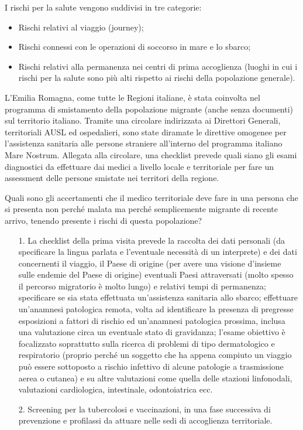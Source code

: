 I rischi per la salute vengono suddivisi in tre categorie:

\begin{itemize}
\item
  Rischi relativi al viaggio (journey);
\item
  Rischi connessi con le operazioni di soccorso in mare e lo sbarco;
\item
  Rischi relativi alla permanenza nei centri di prima accoglienza
  (luoghi in cui i rischi per la salute sono più alti rispetto ai rischi
  della popolazione generale).
\end{itemize}

L'Emilia Romagna, come tutte le Regioni italiane, è stata coinvolta nel
programma di smistamento della popolazione migrante (anche senza
documenti) sul territorio italiano. Tramite una circolare indirizzata ai
Direttori Generali, territoriali AUSL ed ospedalieri, sono state
diramate le direttive omogenee per l'assistenza sanitaria alle persone
straniere all'interno del programma italiano Mare Nostrum. Allegata alla
circolare, una checklist prevede quali siano gli esami diagnostici da
effettuare dai medici a livello locale e territoriale per fare un
assessment delle persone smistate nei territori della regione.

Quali sono gli accertamenti che il medico territoriale deve fare in una
persona che si presenta non perché malata ma perché semplicemente
migrante di recente arrivo, tenendo presente i rischi di questa
popolazione?

\begin{itemize}
\item[1.]  
  La checklist della prima visita prevede la raccolta dei dati personali
  (da specificare la lingua parlata e l'eventuale necessità di un
  interprete) e dei dati concernenti il viaggio, il Paese di origine
  (per avere una visione d'insieme sulle endemie del Paese di origine)
  eventuali Paesi attraversati (molto spesso il percorso migratorio è
  molto lungo) e relativi tempi di permanenza; specificare se sia stata
  effettuata un'assistenza sanitaria allo sbarco; effettuare un'anamnesi
  patologica remota, volta ad identificare la presenza di pregresse
  esposizioni a fattori di rischio ed un'anamnesi patologica prossima,
  inclusa una valutazione circa un eventuale stato di gravidanza;
  l'esame obiettivo è focalizzato soprattutto sulla ricerca di problemi
  di tipo dermatologico e respiratorio (proprio perché un soggetto che
  ha appena compiuto un viaggio può essere sottoposto a rischio
  infettivo di alcune patologie a trasmissione aerea o cutanea) e su
  altre valutazioni come quella delle stazioni linfonodali, valutazioni
  cardiologica, intestinale, odontoiatrica ecc.
\item[2.]
  Screening per la tubercolosi e vaccinazioni, in una fase successiva di
  prevenzione e profilassi da attuare nelle sedi di accoglienza
  territoriale.
\end{itemize}

